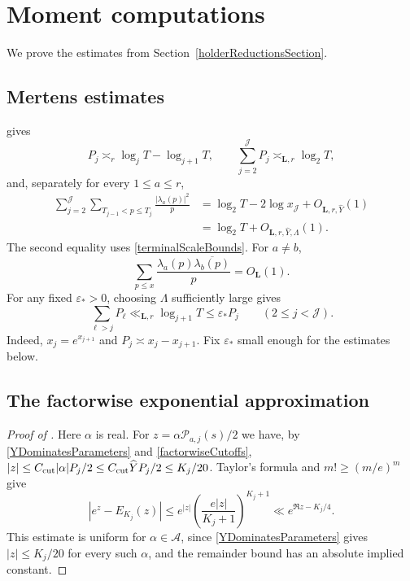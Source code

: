 \documentclass[oneside, 12pt]{amsart}
\theoremstyle{definition}
\begin{document}
	{
		\section{Moment computations}\label{momentComputationsSection}
		
		
		We prove the estimates from Section~\ref{holderReductionsSection}.
		\subsection{Mertens estimates}
		
		 gives
		\begin{equation}\label{primeBlockVariances}
			P_j\asymp_r \log_jT-\log_{j+1}T,
			\qquad
			\sum_{j=2}^{\mathscr J}P_j\asymp_{\boldsymbol L,r}\log_2T,
		\end{equation}
		and, separately for every $1\leq a\leq r$,
		\begin{equation}\label{individualVarianceSum}
			\begin{aligned}
				\sum_{j=2}^{\mathscr J}\sum_{T_{j-1}<p\leq T_j}
				\frac{|\lambda_a(p)|^2}{p}
				&=\log_2T-2\log x_{\mathscr J}
				+O_{\boldsymbol L,r,\widehat Y}(1)\\
				&=\log_2T+O_{\boldsymbol L,r,\widehat Y,\Lambda}(1).
			\end{aligned}
		\end{equation}
		The second equality uses \eqref{terminalScaleBounds}. For $a\ne b$,
		\begin{equation}\label{crossBlockCovariances}
			\sum_{p\leq x}\frac{\lambda_a(p)\overline{\lambda_b(p)}}p=O_{\boldsymbol L}(1).
		\end{equation}
		For any fixed $\varepsilon_*>0$, choosing $\Lambda$ sufficiently large gives
		\begin{equation}\label{primeBlockHierarchy}
			\sum_{\ell>j}P_\ell\ll_{\boldsymbol L,r}\log_{j+1}T
			\leq\varepsilon_*P_j\qquad(2\leq j<\mathscr J).
		\end{equation}
		Indeed, $x_j=e^{x_{j+1}}$ and $P_j\asymp x_j-x_{j+1}$.
		Fix $\varepsilon_*$ small enough for the estimates below.
		\subsection{The factorwise exponential approximation}
		
		\begin{proof}[Proof of ]
			Here $\alpha$ is real.  For
			$z=\alpha\mathcal P_{a,j}(s)/2$ we have, by
			\eqref{YDominatesParameters} and \eqref{factorwiseCutoffs},
			$|z|\leq C_{\rm cut}|\alpha|P_j/2
			\leq C_{\rm cut}\widehat YP_j/2\leq K_j/20$.  Taylor's formula and
			$m!\geq(m/e)^m$ give
			\[
			|e^z-E_{K_j}(z)|
			\leq e^{|z|}\left(\frac{e|z|}{K_j+1}\right)^{K_j+1}
			\ll e^{\Re z-K_j/4}.
			\]
			This estimate is uniform for $\alpha\in\mathscr A$, since
			\eqref{YDominatesParameters} gives $|z|\leq K_j/20$ for every
			such $\alpha$, and the remainder bound has an absolute implied constant.
			

\end{proof}}
\end{document}
